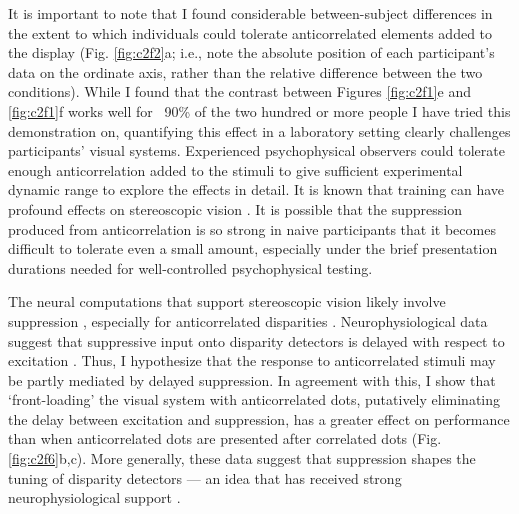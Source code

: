 It is important to note that I found considerable between-subject differences in the extent to which individuals could tolerate anticorrelated elements added to the display (Fig. \ref{fig:c2f2}a; i.e., note the absolute position of each participant's data on the ordinate axis, rather than the relative difference between the two conditions). While I found that the contrast between Figures \ref{fig:c2f1}e and \ref{fig:c2f1}f works well for ~90\% of the two hundred or more people I have tried this demonstration on, quantifying this effect in a laboratory setting clearly challenges participants' visual systems. Experienced psychophysical observers could tolerate enough anticorrelation added to the stimuli to give sufficient experimental dynamic range to explore the effects in detail. It is known that training can have profound effects on stereoscopic vision \cite{Chowdhury:2008aa,Chang:2014ns}. It is possible that the suppression produced from anticorrelation is so strong in naive participants that it becomes difficult to tolerate even a small amount, especially under the brief presentation durations needed for well-controlled psychophysical testing.

The neural computations that support stereoscopic vision likely involve suppression \cite{Goncalves:2017aa,Samonds:2013cs,Haefner:2008jg,Burge:2014qj,Jaini158741}, especially for anticorrelated disparities \cite{Goncalves:2017aa}. Neurophysiological data suggest that suppressive input onto disparity detectors is delayed with respect to excitation \cite{Tanabe:2014ud}. Thus, I hypothesize that the response to anticorrelated stimuli may be partly mediated by delayed suppression. In agreement with this, I show that `front-loading' the visual system with anticorrelated dots, putatively eliminating the delay between excitation and suppression, has a greater effect on performance than when anticorrelated dots are presented after correlated dots (Fig. \ref{fig:c2f6}b,c). More generally, these data suggest that suppression shapes the tuning of disparity detectors --- an idea that has received strong neurophysiological support \cite{Tanabe:2011pt,Tanabe:2014ud,Nieder:2001jl}.

